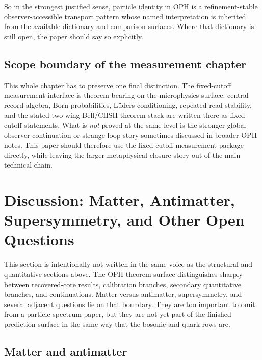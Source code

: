 \documentclass[11pt]{article}
\begin{document}
So in the strongest justified sense, particle identity in OPH is a refinement-stable
observer-accessible transport pattern whose named interpretation is inherited from the
available dictionary and comparison surfaces. Where that dictionary is still open, the paper should say
so explicitly.

\subsection{Scope boundary of the measurement chapter}

This whole chapter has to preserve one final distinction. The fixed-cutoff measurement interface
is theorem-bearing on the microphysics surface: central record algebra, Born
probabilities, L\"uders conditioning, repeated-read stability, and the stated two-wing
Bell/CHSH theorem stack are written there as fixed-cutoff statements. What is \emph{not} proved
at the same level is the stronger global observer-continuation or strange-loop story sometimes
discussed in broader OPH notes. This paper should therefore use the fixed-cutoff measurement
package directly, while leaving the larger metaphysical closure story out of the main technical
chain.

\section{Discussion: Matter, Antimatter, Supersymmetry, and Other Open Questions}

This section is intentionally not written in the same voice as the structural and quantitative
sections above. The OPH theorem surface distinguishes sharply between recovered-core
results, calibration branches, secondary quantitative branches, and continuations. Matter versus
antimatter, supersymmetry, and several adjacent questions lie on that boundary. They are too
important to omit from a particle-spectrum paper, but they are not yet part of the finished
prediction surface in the same way that the bosonic and quark rows are.

\subsection{Matter and antimatter}
\end{document}
